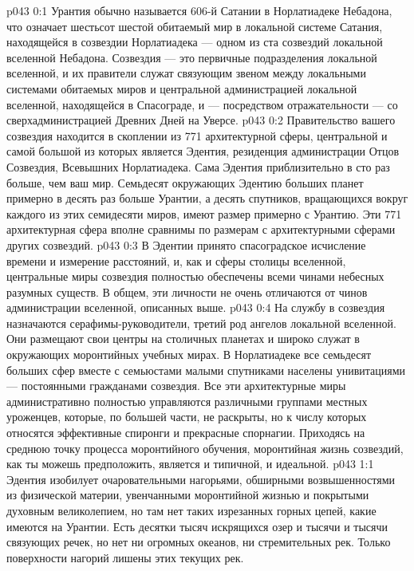 \author{Малаватия Мелхиседек}
\vs p043 0:1 Урантия обычно называется 606\hyp{}й Сатании в Норлатиадеке Небадона, что означает шестьсот шестой обитаемый мир в локальной системе Сатания, находящейся в созвездии Норлатиадека --- одном из ста созвездий локальной вселенной Небадона. Созвездия --- это первичные подразделения локальной вселенной, и их правители служат связующим звеном между локальными системами обитаемых миров и центральной администрацией локальной вселенной, находящейся в Спасограде, и --- посредством отражательности --- со сверхадминистрацией Древних Дней на Уверсе.
\vs p043 0:2 \pc Правительство вашего созвездия находится в скоплении из 771 архитектурной сферы, центральной и самой большой из которых является Эдентия, резиденция администрации Отцов Созвездия, Всевышних Норлатиадека. Сама Эдентия приблизительно в сто раз больше, чем ваш мир. Семьдесят окружающих Эдентию больших планет примерно в десять раз больше Урантии, а десять спутников, вращающихся вокруг каждого из этих семидесяти миров, имеют размер примерно с Урантию. Эти 771 архитектурная сфера вполне сравнимы по размерам с архитектурными сферами других созвездий.
\vs p043 0:3 \pc В Эдентии принято спасоградское исчисление времени и измерение расстояний, и, как и сферы столицы вселенной, центральные миры созвездия полностью обеспечены всеми чинами небесных разумных существ. В общем, эти личности не очень отличаются от чинов администрации вселенной, описанных выше.
\vs p043 0:4 На службу в созвездия назначаются серафимы\hyp{}руководители, третий род ангелов локальной вселенной. Они размещают свои центры на столичных планетах и широко служат в окружающих моронтийных учебных мирах. В Норлатиадеке все семьдесят больших сфер вместе с семьюстами малыми спутниками населены унивитациями --- постоянными гражданами созвездия. Все эти архитектурные миры административно полностью управляются различными группами местных уроженцев, которые, по большей части, не раскрыты, но к числу которых относятся эффективные спиронги и прекрасные спорнагии. Приходясь на среднюю точку процесса моронтийного обучения, моронтийная жизнь созвездий, как ты можешь предположить, является и типичной, и идеальной.
\vs p043 1:1 Эдентия изобилует очаровательными нагорьями, обширными возвышенностями из физической материи, увенчанными моронтийной жизнью и покрытыми духовным великолепием, но там нет таких изрезанных горных цепей, какие имеются на Урантии. Есть десятки тысяч искрящихся озер и тысячи и тысячи связующих речек, но нет ни огромных океанов, ни стремительных рек. Только поверхности нагорий лишены этих текущих рек.
